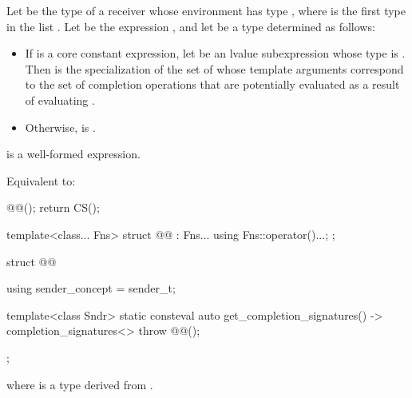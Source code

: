 \begin{itemdescr}
\pnum
Let  be the type of a receiver whose
environment has type , where
 is the first type in the list .
Let  be the expression
, and
let  be a type determined as follows:

\begin{itemize}
\item%
If  is a core constant expression,
let  be an lvalue subexpression
whose type is .
Then  is the specialization of 
the set of whose template arguments
correspond to the set of completion operations
that are potentially evaluated
as a result of evaluating .

\item%
Otherwise,  is .
\end{itemize}

\pnum
\constraints
{} is a well-formed expression.

\pnum
\effects
Equivalent to:
\begin{codeblock}
@@();
return CS();
\end{codeblock}
\end{itemdescr}

\pnum
{}
\begin{codeblock}
template<class... Fns>
struct @@ : Fns... {
  using Fns::operator()...;
};
\end{codeblock}

\pnum
{}
\begin{codeblock}
struct @@ {
  using sender_concept = sender_t;

  template<class Sndr>
    static consteval auto get_completion_signatures() -> completion_signatures<> {
      throw @@();
  }
};
\end{codeblock}
where  is
a type derived from .

